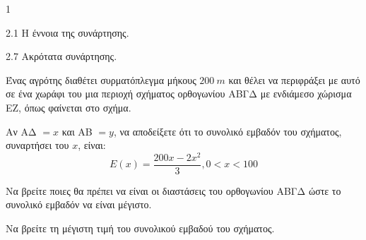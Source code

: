 \begin{ylh}{1}
    \item 2.1 Η έννοια της συνάρτησης.
    \item 2.7 Ακρότατα συνάρτησης.
\end{ylh}
\begin{center} 
\centering
{}
\end{center}
Ένας αγρότης διαθέτει συρματόπλεγμα μήκους $200 \ m$ και θέλει να περιφράξει με αυτό σε ένα χωράφι του μια περιοχή σχήματος ορθογωνίου ΑΒΓΔ με ενδιάμεσο χώρισμα ΕΖ, όπως φαίνεται στο σχήμα.

\begin{alist}
\item Αν ΑΔ $= x$ και ΑΒ $= y$, να αποδείξετε ότι το συνολικό εμβαδόν του σχήματος, συναρτήσει του $x$, είναι:
\[ E(x) = \frac{200x - 2x^2}{3}, 0 < x < 100 \]

\item Να βρείτε ποιες θα πρέπει να είναι οι διαστάσεις του ορθογωνίου ΑΒΓΔ ώστε το συνολικό εμβαδόν να είναι μέγιστο.

\item Να βρείτε τη μέγιστη τιμή του συνολικού εμβαδού του σχήματος.
\end{alist}

